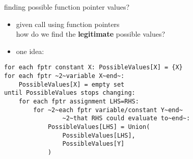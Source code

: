 \begin{frame}[fragile,label=fptrValues]{finding possible function pointer values?}
\begin{itemize}
\item given call using function pointers \\
how do we find the \textbf{legitimate} possible values?
\item one idea:
\end{itemize}
\begin{lstlisting}[language={},style=smaller,
    moredelim={**[is][\btHL<2-|handout:0>]{~2~}{~end~}},
]
for each fptr constant X: PossibleValues[X] = {X}
for each fptr ~2~variable X~end~:
    PossibleValues[X] = empty set
until PossibleValues stops changing:
    for each fptr assignment LHS=RHS:
        for ~2~each fptr variable/constant Y~end~
                ~2~that RHS could evaluate to~end~:
            PossibleValues[LHS] = Union(
                PossibleValues[LHS],
                PossibleValues[Y]
            )
\end{lstlisting}
\end{frame}

